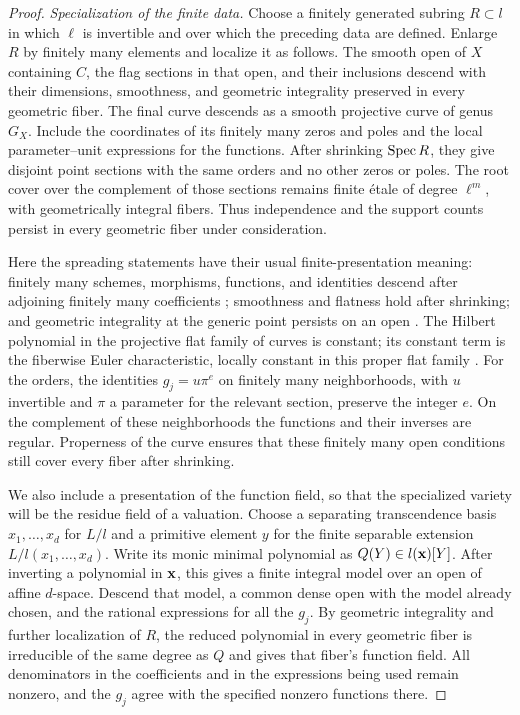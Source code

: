 \begin{proof}
\emph{Specialization of the finite data.}
Choose a finitely generated subring $R\subset l$ in which $\ell$ is
invertible and over which the preceding data are defined.  Enlarge $R$
by finitely many elements and localize it as follows.  The smooth open
of $X$ containing $C$, the flag sections in that open, and their
inclusions descend with their dimensions, smoothness, and geometric
integrality preserved in every geometric fiber.  The final curve
descends as a smooth projective curve of genus $G_X$.
Include the coordinates of its finitely many zeros and poles and the
local parameter--unit expressions for the functions.  After shrinking
$\operatorname{Spec} R$, they give disjoint point sections with the same orders and
no other zeros or poles.  The root cover over the complement of those
sections remains finite \'{e}tale of degree $\ell^m$, with geometrically
integral fibers.  Thus independence and the support counts persist in
every geometric fiber under consideration.

Here the spreading statements have their usual finite-presentation
meaning: finitely many schemes, morphisms, functions, and identities
descend after adjoining finitely many coefficients
\cite[Tags~01ZM, 0C0C, 081F]{Stacks}; smoothness and
flatness hold after shrinking; and geometric integrality at the generic
point persists on an open \cite[Tags~0578, 0559]{Stacks}.
The Hilbert polynomial in the projective
flat family of curves is constant; its constant term is the fiberwise
Euler characteristic, locally constant in this proper flat family
\cite[Lemma~36.32.2, Tag~0B9T]{Stacks}.  For the orders, the identities
$g_j=u\pi^e$ on finitely many neighborhoods, with $u$ invertible and
$\pi$ a parameter for the relevant section, preserve the integer $e$.
On the complement of these neighborhoods the functions and their
inverses are regular.  Properness of the curve ensures that these
finitely many open conditions still cover every fiber after shrinking.

We also include a presentation of the function field, so that the
specialized variety will be the residue field of a valuation.
Choose a separating transcendence basis $x_1,\ldots,x_d$ for $L/l$ and
a primitive element $y$ for the finite separable extension
$L/l(x_1,\ldots,x_d)$.  Write its monic minimal polynomial as
$Q(Y)\in l({\bf x})[Y]$.  After inverting a polynomial in ${\bf x}$,
this gives a finite integral model over an open of affine $d$-space.
Descend that model, a common dense open with the model already chosen,
and the rational expressions for all the $g_j$.
By geometric integrality and further localization of $R$, the reduced
polynomial in every geometric fiber is irreducible of the same degree
as $Q$ and gives that fiber's function field.  All denominators in the
coefficients and in the expressions being used remain nonzero, and the
$g_j$ agree with the specified nonzero functions there.


\end{proof}
